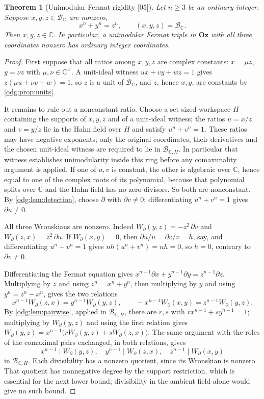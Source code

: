 \documentclass[11pt,oneside]{article}
\numberwithin{equation}{section}
\newtheorem{theorem}{Theorem}[section]
\theoremstyle{definition}
\theoremstyle{remark}
\newcommand{\Oz}{\mathbf{Oz}}
\newcommand{\C}{\mathbb C}
\newcommand{\BC}{\mathcal B_{\C}}
\newcommand{\src}[1]{\textup{\textsf{\small[#1]}}}
\begin{document}
\begin{theorem}[Unimodular Fermat rigidity \src{05}]\label{odg:thm:unimodularfermat}
Let $n\ge3$ be an ordinary integer. Suppose $x,y,z\in\BC$ are nonzero,
\[
 x^n+y^n=z^n,\qquad (x,y,z)=\BC.
\]
Then $x,y,z\in\C$. In particular, a unimodular Fermat triple in $\Oz$
with all three coordinates nonzero has ordinary integer coordinates.
\end{theorem}
\begin{proof}
First suppose that all ratios among $x,y,z$ are complex constants: $x=\mu z$,
$y=\nu z$ with $\mu,\nu\in\C^\times$. A unit-ideal witness $ux+vy+wz=1$ gives
$z(\mu u+\nu v+w)=1$, so $z$ is a unit of $\BC$, and $z$, hence $x,y$, are
constants by \cref{odg:prop:units}.

It remains to rule out a nonconstant ratio. Choose a set-sized workspace $H$
containing the supports of $x,y,z$ and of a unit-ideal witness; the ratios
$u=x/z$ and $v=y/z$ lie in the Hahn field over $H$ and satisfy $u^n+v^n=1$.
These ratios may have negative exponents; only the original coordinates,
their derivatives and the chosen unit-ideal witness are required to lie in
$\mathcal B_{\C,H}$. In particular that witness establishes unimodularity
inside this ring before any comaximality argument is applied.
If one of $u,v$ is constant, the other is algebraic over $\C$, hence equal to
one of the complex roots of its polynomial, because that polynomial splits
over $\C$ and the Hahn field has no zero divisors. So both are nonconstant.
By \cref{odg:lem:detection}, choose $\partial$ with $\partial v\ne0$;
differentiating $u^n+v^n=1$ gives $\partial u\ne0$.

All three Wronskians are nonzero. Indeed
$W_\partial(y,z)=-z^2\,\partial v$ and $W_\partial(z,x)=z^2\,\partial u$. If
$W_\partial(x,y)=0$, then $\partial u/u=\partial v/v=h$, say, and
differentiating $u^n+v^n=1$ gives $nh(u^n+v^n)=nh=0$, so $h=0$, contrary to
$\partial v\ne0$.

Differentiating the Fermat equation gives
$x^{n-1}\partial x+y^{n-1}\partial y=z^{n-1}\partial z$. Multiplying by $z$
and using $z^n=x^n+y^n$, then multiplying by $y$ and using $y^n=z^n-x^n$,
gives the two relations
\[
 x^{n-1}W_\partial(z,x)=y^{n-1}W_\partial(y,z),\qquad
 -x^{n-1}W_\partial(x,y)=z^{n-1}W_\partial(y,z).
\]
By \cref{odg:lem:pairwise}, applied in $\mathcal B_{\C,H}$, there are
$r,s$ with $rx^{n-1}+sy^{n-1}=1$; multiplying by $W_\partial(y,z)$ and using
the first relation gives
$W_\partial(y,z)=x^{n-1}\bigl(rW_\partial(y,z)+sW_\partial(z,x)\bigr)$. The
same argument with the roles of the comaximal pairs exchanged, in both
relations, gives
\begin{equation}\label{odg:eq:fermatdiv}
 x^{n-1}\mid W_\partial(y,z),\quad
 y^{n-1}\mid W_\partial(z,x),\quad
 z^{n-1}\mid W_\partial(x,y)
\end{equation}
in $\mathcal B_{\C,H}$. Each divisibility has a nonzero quotient, since its
Wronskian is nonzero. That quotient has nonnegative degree by the support
restriction, which is essential for the next lower bound; divisibility in
the ambient field alone would give no such bound.


\end{proof}
\end{document}

